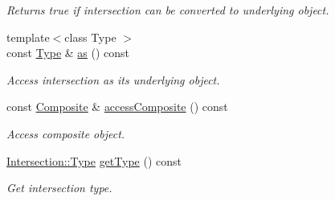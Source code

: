 \begin{DoxyCompactItemize}
$$\begin{DoxyCompactList}\small\item\em Returns true if intersection can be converted to underlying object. \end{DoxyCompactList}\item 
{\footnotesize template$<$class Type $>$ }\\const \hyperlink{classostk_1_1math_1_1geom_1_1d2_1_1_intersection_a8712ffbb37647ed5212ff8ba6da68b00}{Type} \& \hyperlink{classostk_1_1math_1_1geom_1_1d2_1_1_intersection_a296155743b25db7bbad1842a7a392e56}{as} () const
\begin{DoxyCompactList}\small\item\em Access intersection as its underlying object. \end{DoxyCompactList}\item 
const \hyperlink{classostk_1_1math_1_1geom_1_1d2_1_1objects_1_1_composite}{Composite} \& \hyperlink{classostk_1_1math_1_1geom_1_1d2_1_1_intersection_a9bee8c8a7a60ad9980df91046f5f99ea}{access\+Composite} () const
\begin{DoxyCompactList}\small\item\em Access composite object. \end{DoxyCompactList}\item 
\hyperlink{classostk_1_1math_1_1geom_1_1d2_1_1_intersection_a8712ffbb37647ed5212ff8ba6da68b00}{Intersection\+::\+Type} \hyperlink{classostk_1_1math_1_1geom_1_1d2_1_1_intersection_afc5b78c8fb68d890ff0066401bedaad4}{get\+Type} () const
\begin{DoxyCompactList}\small\item\em Get intersection type. \end{DoxyCompactList}\end{DoxyCompactItemize}
